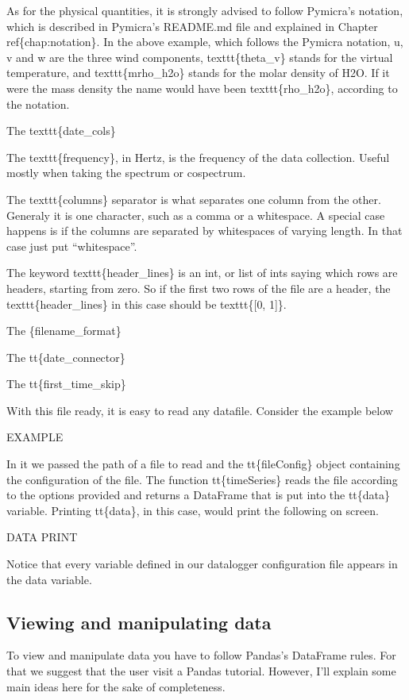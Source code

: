 \documentclass[a4paper,10pt,english]{sphinxmanual}
\begin{document}
As for the physical quantities, it is strongly advised to follow Pymicra's
notation, which is described in Pymicra's README.md file and explained in
Chapter ref\{chap:notation\}. In the above example, which follows the Pymicra
notation, u, v and w are the three wind components, texttt\{theta\_v\} stands for
the virtual temperature, and texttt\{mrho\_h2o\} stands for the molar density of
H2O. If it were the mass density the name would have been texttt\{rho\_h2o\},
according to the notation.

The texttt\{date\_cols\}

The texttt\{frequency\}, in Hertz, is the frequency of the data collection.
Useful mostly when taking the spectrum or cospectrum.

The texttt\{columns\} separator is what separates one column from the other.
Generaly it is one character, such as a comma or a whitespace. A special case
happens is if the columns are separated by whitespaces of varying length. In
that case just put ``whitespace''.

The keyword texttt\{header\_lines\} is an int, or list of ints saying which rows
are headers, starting from zero. So if the first two rows of the file are a
header, the texttt\{header\_lines\} in this case should be texttt\{{[}0, 1{]}\}.

The \{filename\_format\}

The tt\{date\_connector\}

The tt\{first\_time\_skip\}

With this file ready, it is easy to read any datafile. Consider the example
below

EXAMPLE

In it we passed the path of a file to read and the tt\{fileConfig\} object
containing the configuration of the file. The function tt\{timeSeries\} reads the
file according to the options provided and returns a DataFrame that is put into
the tt\{data\} variable. Printing tt\{data\}, in this case, would print the
following on screen.

DATA PRINT

Notice that every variable defined in our datalogger configuration file appears in the
data variable.


\subsection{Viewing and manipulating data}
\label{tutorial:viewing-and-manipulating-data}
To view and manipulate data you have to follow Pandas's DataFrame rules. For
that we suggest that the user visit a Pandas tutorial. However, I'll explain
some main ideas here for the sake of completeness.
\end{document}
